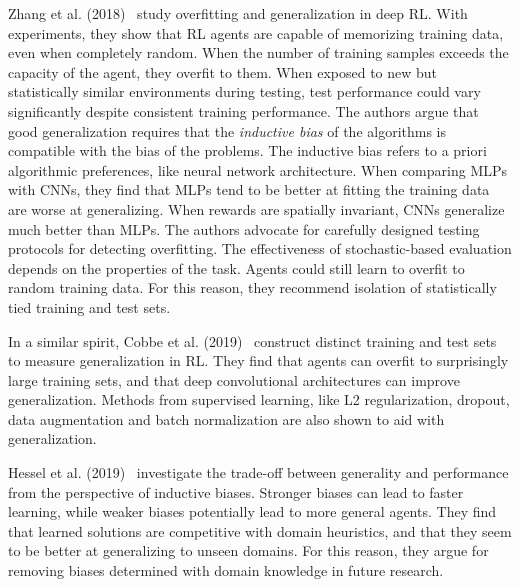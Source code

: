 Zhang et al. (2018)~\cite{zhang_overfitting_2018} study overfitting and generalization in deep RL.
With experiments, they show that RL agents are capable of memorizing training data, even when completely random.
When the number of training samples exceeds the capacity of the agent, they overfit to them.
When exposed to new but statistically similar environments during testing, test performance could vary significantly despite consistent training performance.
The authors argue that good generalization requires that the \textit{inductive bias} of the algorithms is compatible with the bias of the problems.
The inductive bias refers to a priori algorithmic preferences, like neural network architecture.
When comparing MLPs with CNNs, they find that MLPs tend to be better at fitting the training data are worse at generalizing.
When rewards are spatially invariant, CNNs generalize much better than MLPs.
The authors advocate for carefully designed testing protocols for detecting overfitting.
The effectiveness of stochastic-based evaluation depends on the properties of the task.
Agents could still learn to overfit to random training data. 
For this reason, they recommend isolation of statistically tied training and test sets.

In a similar spirit, Cobbe et al. (2019)~\cite{cobbe_generalization_2019} construct distinct training and test sets to measure generalization in RL.
They find that agents can overfit to surprisingly large training sets, and that deep convolutional architectures can improve generalization.
Methods from supervised learning, like L2 regularization, dropout, data augmentation and batch normalization are also shown to aid with generalization.

Hessel et al. (2019)~\cite{hessel_inductive_2019} investigate the trade-off between generality and performance from the perspective of inductive biases.
Stronger biases can lead to faster learning, while weaker biases potentially lead to more general agents.
They find that learned solutions are competitive with domain heuristics, and that they seem to be better at generalizing to unseen domains.
For this reason, they argue for removing biases determined with domain knowledge in future research.


